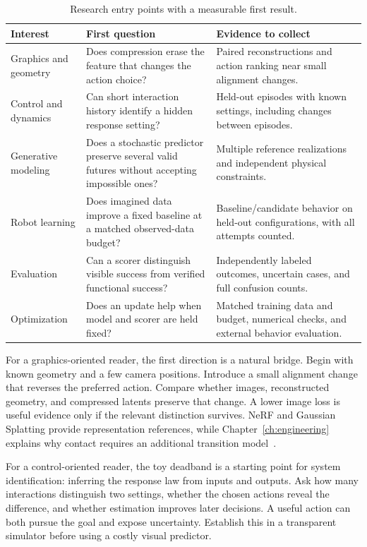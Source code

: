 \begin{table}[htbp]\centering\small
\caption{Research entry points with a measurable first result.}
\begin{tabularx}{\linewidth}{@{}p{26mm}YY@{}}\toprule
Interest & First question & Evidence to collect\\\midrule
Graphics and geometry & Does compression erase the feature that changes the action choice? & Paired reconstructions and action ranking near small alignment changes.\\
Control and dynamics & Can short interaction history identify a hidden response setting? & Held-out episodes with known settings, including changes between episodes.\\
Generative modeling & Does a stochastic predictor preserve several valid futures without accepting impossible ones? & Multiple reference realizations and independent physical constraints.\\
Robot learning & Does imagined data improve a fixed baseline at a matched observed-data budget? & Baseline/candidate behavior on held-out configurations, with all attempts counted.\\
Evaluation & Can a scorer distinguish visible success from verified functional success? & Independently labeled outcomes, uncertain cases, and full confusion counts.\\
Optimization & Does an update help when model and scorer are held fixed? & Matched training data and budget, numerical checks, and external behavior evaluation.\\\bottomrule
\end{tabularx}
\end{table}

For a graphics-oriented reader, the first direction is a natural bridge. Begin with known geometry and a few camera positions. Introduce a small alignment change that reverses the preferred action. Compare whether images, reconstructed geometry, and compressed latents preserve that change. A lower image loss is useful evidence only if the relevant distinction survives. NeRF and Gaussian Splatting provide representation references, while Chapter~\ref{ch:engineering} explains why contact requires an additional transition model~\citep{nerf,gaussians}.

For a control-oriented reader, the toy deadband is a starting point for system identification: inferring the response law from inputs and outputs. Ask how many interactions distinguish two settings, whether the chosen actions reveal the difference, and whether estimation improves later decisions. A useful action can both pursue the goal and expose uncertainty. Establish this in a transparent simulator before using a costly visual predictor.

